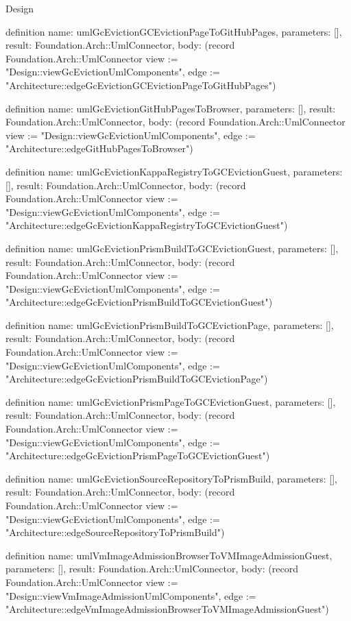 \begin{lexlean}{Design}
\begin{semanticmodule}
definition{
  name: umlGcEvictionGCEvictionPageToGitHubPages,
  parameters: [],
  result: Foundation.Arch::UmlConnector,
  body: (record Foundation.Arch::UmlConnector {view := "Design::viewGcEvictionUmlComponents", edge := "Architecture::edgeGcEvictionGCEvictionPageToGitHubPages"})
}

definition{
  name: umlGcEvictionGitHubPagesToBrowser,
  parameters: [],
  result: Foundation.Arch::UmlConnector,
  body: (record Foundation.Arch::UmlConnector {view := "Design::viewGcEvictionUmlComponents", edge := "Architecture::edgeGitHubPagesToBrowser"})
}

definition{
  name: umlGcEvictionKappaRegistryToGCEvictionGuest,
  parameters: [],
  result: Foundation.Arch::UmlConnector,
  body: (record Foundation.Arch::UmlConnector {view := "Design::viewGcEvictionUmlComponents", edge := "Architecture::edgeGcEvictionKappaRegistryToGCEvictionGuest"})
}

definition{
  name: umlGcEvictionPrismBuildToGCEvictionGuest,
  parameters: [],
  result: Foundation.Arch::UmlConnector,
  body: (record Foundation.Arch::UmlConnector {view := "Design::viewGcEvictionUmlComponents", edge := "Architecture::edgeGcEvictionPrismBuildToGCEvictionGuest"})
}

definition{
  name: umlGcEvictionPrismBuildToGCEvictionPage,
  parameters: [],
  result: Foundation.Arch::UmlConnector,
  body: (record Foundation.Arch::UmlConnector {view := "Design::viewGcEvictionUmlComponents", edge := "Architecture::edgeGcEvictionPrismBuildToGCEvictionPage"})
}

definition{
  name: umlGcEvictionPrismPageToGCEvictionGuest,
  parameters: [],
  result: Foundation.Arch::UmlConnector,
  body: (record Foundation.Arch::UmlConnector {view := "Design::viewGcEvictionUmlComponents", edge := "Architecture::edgeGcEvictionPrismPageToGCEvictionGuest"})
}

definition{
  name: umlGcEvictionSourceRepositoryToPrismBuild,
  parameters: [],
  result: Foundation.Arch::UmlConnector,
  body: (record Foundation.Arch::UmlConnector {view := "Design::viewGcEvictionUmlComponents", edge := "Architecture::edgeSourceRepositoryToPrismBuild"})
}

definition{
  name: umlVmImageAdmissionBrowserToVMImageAdmissionGuest,
  parameters: [],
  result: Foundation.Arch::UmlConnector,
  body: (record Foundation.Arch::UmlConnector {view := "Design::viewVmImageAdmissionUmlComponents", edge := "Architecture::edgeVmImageAdmissionBrowserToVMImageAdmissionGuest"})
}


\end{semanticmodule}
\end{lexlean}

